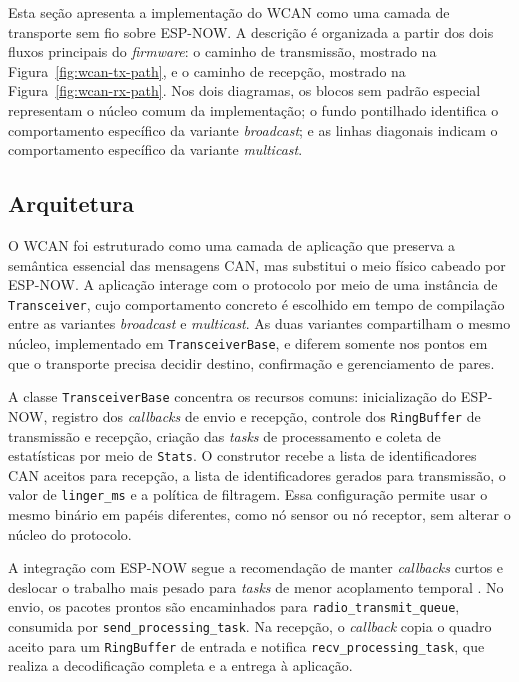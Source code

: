 Esta seção apresenta a implementação do WCAN como uma camada de transporte
sem fio sobre ESP-NOW. A descrição é organizada a partir dos dois fluxos
principais do \emph{firmware}: o caminho de transmissão, mostrado na
Figura~\ref{fig:wcan-tx-path}, e o caminho de recepção, mostrado na
Figura~\ref{fig:wcan-rx-path}. Nos dois diagramas, os blocos sem padrão especial
representam o núcleo comum da implementação; o fundo pontilhado identifica o
comportamento específico da variante \emph{broadcast}; e as linhas diagonais indicam o
comportamento específico da variante \emph{multicast}.

\subsection{Arquitetura}

O WCAN foi estruturado como uma camada de aplicação que preserva a semântica
essencial das mensagens CAN, mas substitui o meio físico cabeado por ESP-NOW. A
aplicação interage com o protocolo por meio de uma instância de
\texttt{Transceiver}, cujo comportamento concreto é escolhido em tempo de
compilação entre as variantes \emph{broadcast} e \emph{multicast}. As duas variantes
compartilham o mesmo núcleo, implementado em \texttt{TransceiverBase}, e diferem
somente nos pontos em que o transporte precisa decidir destino, confirmação e
gerenciamento de pares.

A classe \texttt{TransceiverBase} concentra os recursos comuns: inicialização do
ESP-NOW, registro dos \emph{callbacks} de envio e recepção, controle dos
\texttt{RingBuffer} de transmissão e recepção, criação das \emph{tasks} de processamento
e coleta de estatísticas por meio de \texttt{Stats}. O construtor recebe a lista
de identificadores CAN aceitos para recepção, a lista de identificadores gerados
para transmissão, o valor de \texttt{linger\_ms} e a política de filtragem. Essa
configuração permite usar o mesmo binário em papéis diferentes, como nó sensor ou
nó receptor, sem alterar o núcleo do protocolo.

A integração com ESP-NOW segue a recomendação de manter \emph{callbacks} curtos e
deslocar o trabalho mais pesado para \emph{tasks} de menor acoplamento temporal
\cite{espressif_espnow_programming_guide}. No envio, os pacotes prontos são
encaminhados para \texttt{radio\_transmit\_queue}, consumida por
\texttt{send\_processing\_task}. Na recepção, o \emph{callback} copia o quadro aceito
para um \texttt{RingBuffer} de entrada e notifica \texttt{recv\_processing\_task},
que realiza a decodificação completa e a entrega à aplicação.

